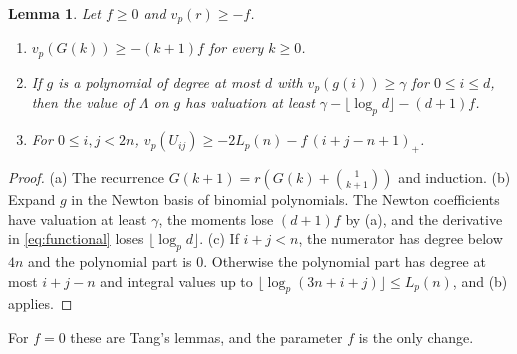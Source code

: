\documentclass[11pt]{amsart}
\newtheorem{lemma}[theorem]{Lemma}
\theoremstyle{definition}
\theoremstyle{remark}
\numberwithin{equation}{section}
\begin{document}
\begin{lemma}\label{lem:V}
Let $f\ge0$ and $v_p(r)\ge-f$.
\begin{enumerate}[label=(\alph*)]
\item $v_p(G(k))\ge-(k+1)f$ for every $k\ge0$.
\item If $g$ is a polynomial of degree at most $d$ with $v_p(g(i))\ge\gamma$ for $0\le i\le d$, then the value of
 $\Lambda$ on $g$ has valuation at least $\gamma-\lfloor\log_pd\rfloor-(d+1)f$.
\item For $0\le i,j<2n$, $v_p(U_{ij})\ge-2L_p(n)-f\,(i+j-n+1)_+$.
\end{enumerate}
\end{lemma}

\begin{proof}
(a) The recurrence $G(k+1)=r(G(k)+\binom1{k+1})$ and induction. (b) Expand $g$ in the Newton basis of binomial
polynomials. The Newton coefficients have valuation at least $\gamma$, the moments lose $(d+1)f$ by (a), and the
derivative in \eqref{eq:functional} loses $\lfloor\log_pd\rfloor$. (c) If $i+j<n$, the numerator has degree below $4n$
and the polynomial part is $0$. Otherwise the polynomial part has degree at most $i+j-n$ and integral values up to
$\lfloor\log_p(3n+i+j)\rfloor\le L_p(n)$, and (b) applies.
\end{proof}

For $f=0$ these are Tang's lemmas, and the parameter $f$ is the only change.
\end{document}
